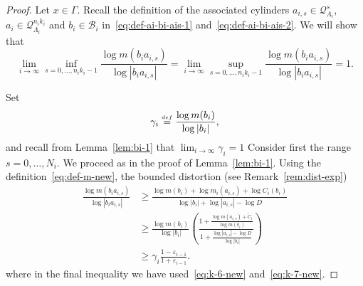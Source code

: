 \documentclass[10pt,a4paper]{amsart}
\newcommand{\cB}{{\mathcal B}}
\newcommand{\cQ}{{\mathcal Q}}
\newcommand{\eps}{\varepsilon}
\newcommand{\eqdef}{\stackrel{\scriptscriptstyle\rm def}{=}}
\begin{document}
\begin{proof}
   Let $x\in \Gamma$. 
  Recall the definition of the associated cylinders $a_{i,s} \in \cQ_{\Lambda_i}^{s}$, $a_{i}\in \cQ_{\Lambda_i}^{n_ik_i}$ and $b_i\in \cB_i$ in~\eqref{eq:def-ai-bi-ais-1} and~\eqref{eq:def-ai-bi-ais-2}.
  We will show that
  \begin{equation}\label{eq:dim-claim}
    \lim_{i\to\infty}
    \inf_{s = 0 ,\ldots, n_i k_i - 1} \frac{ \log m ( b_i a_{i,s} ) }{ \log |b_i a_{i,s} |}
    =
    \lim_{ i \to \infty }\sup_{s = 0 ,\ldots, n_i k_i - 1} \frac{ \log m ( b_i a_{i,s} ) }{ \log |b_i a_{i,s} |}
    = 1.
  \end{equation}

  Set
  \[
    \gamma_i \eqdef \frac{ \log m (b_i)} { \log |b_i|},
  \]
  and recall from Lemma~\ref{lem:bi-1} that $\lim_{i\to\infty} \gamma_i = 1$
  Consider first the range $s = 0, \ldots, N_i$.
  We proceed as in the proof of Lemma~\ref{lem:bi-1}.
  Using the definition~\eqref{eq:def-m-new}, the bounded distortion (see Remark~\ref{rem:dist-exp})
  \begin{align}
    \nonumber
    \frac{
      \log m ( b_i a_{i,s})
    }
    {
      \log |b_i a_{i,s}|
    }
    &\ge 
    \frac{ \log m ( b_i ) + \log m_i (a_{i,s}) + \log C_i (b_i) }
    { \log |b_{i}|  + \log |a_{i,s}| - \log D } \\
    \nonumber
    &\ge
    \frac{ \log m  (b_i) }{ \log |b_i| }
    \left(
      \frac{ 1
       + \frac{ \log m ( a_{i,s} ) + \widetilde C_{i} }{ \log m (b_i) }
      }{ 1
       + \frac{ \log |a_{i,s}| - \log D }{ \log |b_i|}
      }
    \right) \\
    \label{eq:dim-s-small}
  &\ge
  \gamma_i \frac{ 1 - \eps_{ i - 1} }{ 1 + \eps_{ i - 1 } }.
  \end{align}
  where in the final inequality we have
  used~\eqref{eq:k-6-new} and~\eqref{eq:k-7-new}.


\end{proof}
\end{document}
